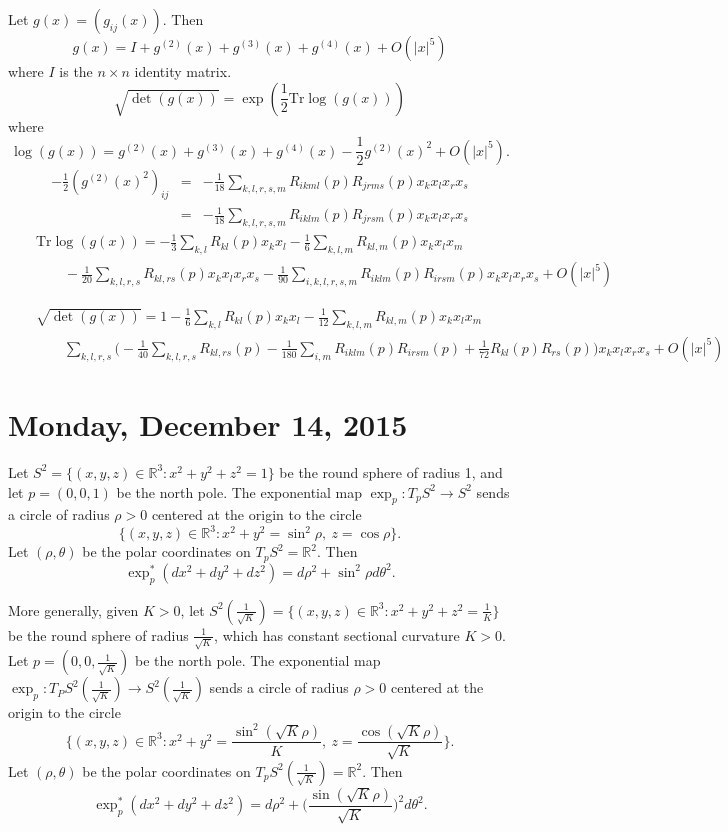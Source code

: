\documentclass{amsart}
\numberwithin{equation}{section}
\newcommand{\bR}{\mathbb{R}}
\theoremstyle{definition}
\theoremstyle{theorem}
\begin{document}
Let $g(x)= (g_{ij}(x))$. Then
$$
g(x)= I + g^{(2)}(x) + g^{(3)}(x)+g^{(4)}(x) + O(|x|^5)
$$
where $I$ is the $n\times n$ identity matrix.
$$
\sqrt{ \det(g(x)) }= \exp(\frac{1}{2} \mathrm{Tr}\log(g(x)))
$$
where
$$
\log(g(x))= g^{(2)}(x)+ g^{(3)}(x) + g^{(4)}(x)-\frac{1}{2} g^{(2)}(x)^2 + O(|x|^5).
$$
\begin{eqnarray*}
-\frac{1}{2} \left(g^{(2)}(x)^2\right)_{ij}
&=&-\frac{1}{18} \sum_{k,l,r,s,m} R_{ikml}(p) R_{jrms}(p) x_k x_l x_r x_s\\
&=& -\frac{1}{18} \sum_{k,l,r,s,m} R_{iklm}(p) R_{jrsm}(p) x_k x_l x_r x_s
\end{eqnarray*}
\begin{eqnarray*}
&& \mathrm{Tr}\log(g(x))= 
- \frac{1}{3} \sum_{k,l} R_{kl}(p) x_k x_l
 - \frac{1}{6} \sum_{k,l,m} R_{kl,m}(p) x_kx_lx_m \\
&& \quad \quad - \frac{1}{20} \sum_{k,l,r,s}R_{kl,rs}(p) x_kx_lx_r x_s - \frac{1}{90} 
\sum_{i,k,l,r,s,m} R_{iklm}(p)R_{irsm}(p) x_kx_lx_rx_s + O(|x|^5)
\end{eqnarray*}


\begin{eqnarray*}
&& \sqrt{ \det(g(x))} = 
1 - \frac{1}{6} \sum_{k,l} R_{kl}(p) x_k x_l
 - \frac{1}{12} \sum_{k,l,m} R_{kl,m}(p) x_kx_lx_m \\
&& \quad \quad \sum_{k,l,r,s} \Big( - \frac{1}{40} \sum_{k,l,r,s}R_{kl,rs}(p) - \frac{1}{180} 
\sum_{i,m} R_{iklm}(p)R_{irsm}(p) +\frac{1}{72} R_{kl}(p) R_{rs}(p)\Big) 
x_k x_l x_r x_s + O(|x|^5)
\end{eqnarray*}


\section{Monday, December 14, 2015} 




Let $S^2=\{ (x,y,z)\in \bR^3: x^2+y^2+z^2=1\}$ be the round sphere of radius 1, and let $p=(0,0,1)$ be the north pole. 
The exponential map  $\exp_p: T_p S^2\to S^2$ sends
a circle of radius $\rho>0$ centered at the origin to the circle 
$$
\{ (x,y,z)\in \bR^3: x^2+y^2=\sin^2\rho,\ z=\cos\rho\}.
$$
Let $(\rho,\theta)$ be the polar coordinates on $T_p S^2 =\bR^2$. Then 
$$
\exp_p^*(dx^2+dy^2+dz^2)= d\rho^2+ \sin^2\rho d\theta^2.
$$ 

More generally, given $K>0$, let $S^2(\frac{1}{\sqrt{K}}) =\{ (x,y,z)\in \bR^3: x^2+y^2+z^2=\frac{1}{K}\}$
be the round sphere of radius $\frac{1}{\sqrt{K}}$, which has constant sectional curvature $K>0$.
Let $p=(0,0,\frac{1}{\sqrt{K}})$ be the north pole.
The exponential map $\exp_p: T_P S^2(\frac{1}{\sqrt{K}})\to S^2(\frac{1}{\sqrt{K}})$
sends a circle of radius $\rho>0$ centered at the origin  to the circle  
$$
\{ (x,y,z)\in \bR^3: x^2+y^2=\frac{\sin^2(\sqrt{K}\rho)}{K},\ z=\frac{\cos(\sqrt{K}\rho)}{\sqrt{K}}\}.
$$ 
Let $(\rho,\theta)$ be the polar coordinates on $T_p S^2(\frac{1}{\sqrt{K}}) =\bR^2$. Then 
$$
\exp_p^*(dx^2+dy^2+dz^2)= d\rho^2+ \Big(\frac{\sin(\sqrt{K}\rho)}{\sqrt{K}}\Big)^2 d\theta^2. 
$$
\end{document}
